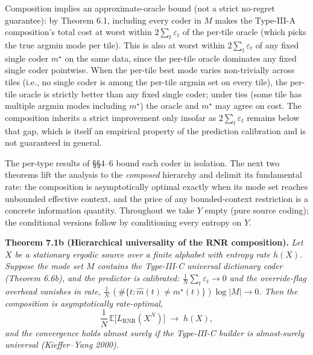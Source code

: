 \documentclass[
]{article}
\begin{document}
Composition implies an approximate-oracle bound (not a strict
no-regret guarantee): by Theorem 6.1, including every coder in $M$
makes the Type-III-A composition's total cost at worst within
$2 \sum_t \varepsilon_t$ of the per-tile oracle (which picks the
true argmin mode per tile). This is also at worst within
$2 \sum_t \varepsilon_t$ of any fixed single coder $m^\star$ on the
same data, since the per-tile oracle dominates any fixed single
coder pointwise. When the per-tile best mode varies non-trivially across tiles
(i.e., no single coder is among the per-tile argmin set on every
tile), the per-tile oracle is strictly better than any fixed single
coder; under ties (some tile has multiple argmin modes including
$m^\star$) the oracle and $m^\star$ may agree on cost. The
composition inherits a strict improvement only insofar as
$2 \sum_t \varepsilon_t$ remains below that gap, which is itself an
empirical property of the prediction calibration and is not
guaranteed in general.

The per-type results of §§4--6 bound each coder in isolation. The next
two theorems lift the analysis to the \emph{composed} hierarchy and
delimit its fundamental rate: the composition is asymptotically optimal
exactly when its mode set reaches unbounded effective context, and the
price of any bounded-context restriction is a concrete information
quantity. Throughout we take $Y$ empty (pure source coding); the
conditional versions follow by conditioning every entropy on $Y$.

\textbf{Theorem 7.1b (Hierarchical universality of the RNR composition).}
\emph{Let $X$ be a stationary ergodic source over a finite alphabet with
entropy rate $h(X)$. Suppose the mode set $M$ contains the Type-III-C
universal dictionary coder (Theorem 6.6b), and the predictor is
\emph{calibrated}: $\tfrac1N \sum_t \varepsilon_t \to 0$ and the
override-flag overhead vanishes in rate, $\tfrac1N \, (\#\{t : \hat m(t)
\ne m^\star(t)\}) \log|M| \to 0$. Then the composition is asymptotically
rate-optimal,}
\[
\frac1N \, \mathbb{E}\bigl[L_{\mathrm{RNR}}(X^N)\bigr]
\;\longrightarrow\; h(X),
\]
\emph{and the convergence holds almost surely if the Type-III-C builder
is almost-surely universal (Kieffer--Yang 2000).}
\end{document}
